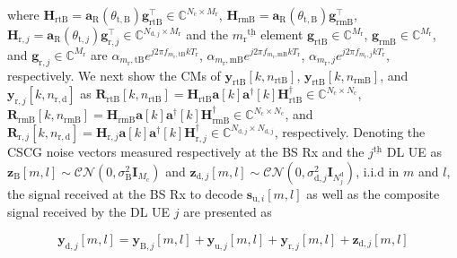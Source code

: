 \documentclass[10pt,journal]{IEEEtran}
\newcommand{\paren}[1]{\left({#1}\right)}
\newcommand{\bracket}[1]{{\left [{#1}\right ]}}
\newcommand{\ith}[1]    {{#1}^{\underline{\text{th}}}}
\newcommand{\rr}{_\mathrm{r}}
\newcommand{\cc}{_\mathrm{c}}
\newcommand{\target}{\mathrm{t}}
\theoremstyle{definition}
\begin{document}
	where $\mathbf{H}_{\mathrm{rtB}}=\mathbf{a}_\mathrm{R}\paren{\theta_{\target,\mathrm{B}}}\mathbf{g}^\top_{\mathrm{rtB}}\in\mathbb{C}^{N_{\mathrm{c}}\times M\rr}$, $\mathbf{H}_{\mathrm{rmB}}=\mathbf{a}_\mathrm{R}\paren{\theta_{\target,\mathrm{B}}}\mathbf{g}^\top_{\mathrm{rmB}}$, $\mathbf{H}_{\mathrm{r},j}=\mathbf{a}_\mathrm{R}\paren{\theta_{\target,j}}\mathbf{g}^\top_{\mathrm{r},j}\in\mathbb{C}^{N_{\mathrm{d},j}\times M\rr}$ and the $\ith{m\rr}$ element $\mathbf{g}_{\mathrm{rtB}}\in\mathbb{C}^{M\rr}$, $\mathbf{g}_{\mathrm{rmB}}\in\mathbb{C}^{M\rr}$, and $\mathbf{g}_{\mathrm{r},j}\in\mathbb{C}^{M\rr}$ are $\alpha_{m\rr,\mathrm{tB}}e^{j2\pi f_{m\rr,\mathrm{tB}}kT_{\mathrm{r}}}$, $\alpha_{m\rr,\mathrm{mB}}e^{j2\pi f_{m\rr,\mathrm{mB}}kT_{\mathrm{r}}}$, $\alpha_{m\rr,j}e^{j2\pi f_{m\rr,j}kT_{\mathrm{r}}}$, respectively. We next show the CMs of $\mathbf{y}_{\mathrm{rtB}}\bracket{k,n_{\mathrm{rtB}}}$, $\mathbf{y}_{\mathrm{rtB}}\bracket{k,n_{\mathrm{rmB}}}$, and $\mathbf{y}_{\mathrm{r},j}\bracket{k,n_{\mathrm{r,d}}}$ as $\mathbf{R}_{\mathrm{rtB}}\bracket{k,n_{\mathrm{rtB}}}=\mathbf{H}_{\mathrm{rtB}}\mathbf{a}\bracket{k}\mathbf{a}^\dagger\bracket{k}\mathbf{H}^\dagger_{\mathrm{rtB}}\in\mathbb{C}^{N_{\mathrm{c}}\times N_{\mathrm{c}}}$, $\mathbf{R}_{\mathrm{rmB}}\bracket{k,n_{\mathrm{rmB}}}=\mathbf{H}_{\mathrm{rmB}}\mathbf{a}\bracket{k}\mathbf{a}^\dagger\bracket{k}\mathbf{H}^\dagger_{\mathrm{rmB}}\in\mathbb{C}^{N_{\mathrm{c}}\times N_{\mathrm{c}}}$, and $\mathbf{R}_{\mathrm{r},j}\bracket{k,n_{\mathrm{r,d}}}=\mathbf{H}_{\mathrm{r},j}\mathbf{a}\bracket{k}\mathbf{a}^\dagger\bracket{k}\mathbf{H}^\dagger_{\mathrm{r},j}\in\mathbb{C}^{N_{\mathrm{d},j}\times N_{\mathrm{d},j}}$, respectively. \color{black} 
	Denoting the CSCG noise vectors measured respectively at the BS Rx and the $\ith{j}$ DL UE as $\mathbf{z}_\textrm{B}\bracket{m,l}\sim\mathcal{CN}\paren{0,\sigma^2_{\textrm{B}}\mathbf{I}_{M\cc}}$ and $\mathbf{z}_{\textrm{d},j}\bracket{m,l}\sim\mathcal{CN}\paren{0,\sigma^2_{\mathrm{d},j}\mathbf{I}_{N^\mathrm{d}_{j}}}$, i.i.d in $m$ and $l$, the signal received at the BS Rx to decode $\mathbf{s}_{\textrm{u},i}\bracket{m,l}$ as well as the composite signal received by the DL UE $j$ are presented as
	\par\noindent\small
	\begin{equation}
		\mathbf{y}_{\textrm{d},j}\bracket{m,l}=\mathbf{y}_{\textrm{B},j}\bracket{m,l}+\mathbf{y}_{\mathrm{u},j}\bracket{m,l}+\mathbf{y}_{\mathrm{r},j}\bracket{m,l}+\mathbf{z}_{\textrm{d},j}\bracket{m,l}
	\end{equation}\normalsize
\end{document}
